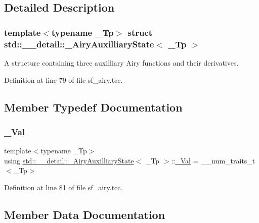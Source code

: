 \subsection{Detailed Description}
\subsubsection*{template$<$typename \+\_\+\+Tp$>$\newline
struct std\+::\+\_\+\+\_\+detail\+::\+\_\+\+Airy\+Auxilliary\+State$<$ \+\_\+\+Tp $>$}

A structure containing three auxilliary Airy functions and their derivatives. 

Definition at line 79 of file sf\+\_\+airy.\+tcc.



\subsection{Member Typedef Documentation}
\mbox{\label{structstd_1_1____detail_1_1__AiryAuxilliaryState_adbacd5bf6d38b157a1e0149cd4b8a9a2}} 
\subsubsection{\texorpdfstring{\+\_\+\+Val}{\_Val}}
{\footnotesize\ttfamily template$<$typename \+\_\+\+Tp$>$ \\
using \hyperlink{structstd_1_1____detail_1_1__AiryAuxilliaryState}{std\+::\+\_\+\+\_\+detail\+::\+\_\+\+Airy\+Auxilliary\+State}$<$ \+\_\+\+Tp $>$\+::\hyperlink{structstd_1_1____detail_1_1__AiryAuxilliaryState_adbacd5bf6d38b157a1e0149cd4b8a9a2}{\+\_\+\+Val} =  \+\_\+\+\_\+num\+\_\+traits\+\_\+t$<$\+\_\+\+Tp$>$}



Definition at line 81 of file sf\+\_\+airy.\+tcc.



\subsection{Member Data Documentation}
\mbox{\label{structstd_1_1____detail_1_1__AiryAuxilliaryState_acff728bf75b30e81549a554ef4c149c1}} 
